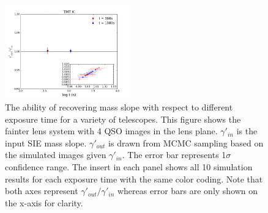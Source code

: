 \documentclass[a4paper,11pt]{article}
\begin{document}
\begin{figure}
\begin{center}
\includegraphics[width=0.48\textwidth]{gamma_135949_4QSOimages_TMT.png}
\end{center}
\caption{The ability of recovering mass slope with respect to different exposure time for a variety of telescopes. This figure shows the fainter lens system with 4 QSO images in the lens plane. $\gamma'_{in}$ is the input SIE mass slope. $\gamma'_{out}$ is drawn from MCMC sampling based on the simulated images given $\gamma'_{in}$. The error bar represents 1$\sigma$ confidence range. The insert in each panel shows all 10 simulation results for each exposure time with the same color coding. Note that both axes represent $\gamma'_{out}/\gamma'_{in}$ whereas error bars are only shown on the x-axis for clarity.}
\label{fig:gamma_fainter_4QSOimages}
\end{figure}
\end{document}
